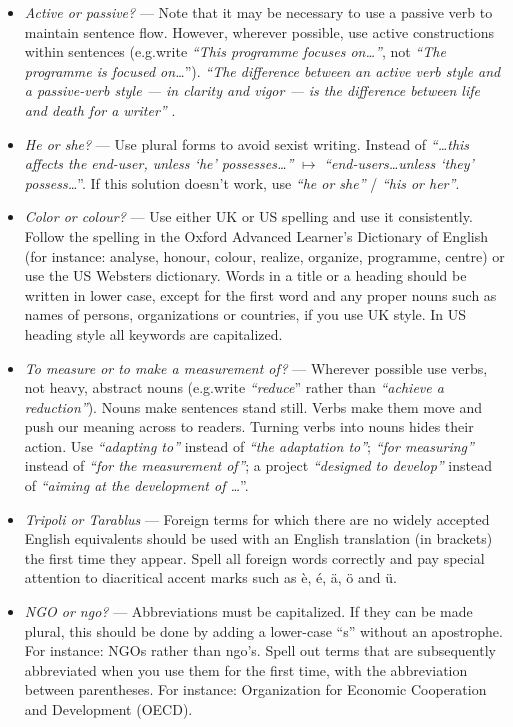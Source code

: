 \documentclass[graybox,envcountchap,sectrefs,UStrade]{svmono}
\begin{document}
 \begin{itemize}
  \item \emph{Active or passive?} --- Note that it may be necessary to use a passive verb to maintain sentence flow. However, wherever possible, use active constructions within sentences (e.g.\@ write \emph{``This programme focuses on\ldots ''}, not \emph{``The programme is focused on\ldots }''). \emph{``The difference between an active verb style and a passive-verb style --- in clarity and vigor --- is the difference between life and death for a writer''} \citep{Zinsser2006}.
 \item \emph{He or she?} --- Use plural forms to avoid sexist writing. Instead of \emph{``\ldots this affects the end-user, unless `he' possesses\ldots''} $\mapsto$  \emph{``end-users\ldots unless `they' possess\ldots }''. If this solution doesn't work, use \emph{``he or she''} / \emph{``his or her''}.
 \item \emph{Color or colour?} --- Use either UK or US spelling and use it consistently. Follow the spelling in the Oxford Advanced Learner's Dictionary of English (for instance: analyse, honour, colour, realize, organize, programme, centre) or use the US Websters dictionary. Words in a title or a heading should be written in lower case, except for the first word and any proper nouns such as names of persons, organizations or countries, if you use UK style. In US heading style all keywords are capitalized.
 \item \emph{To measure or to make a measurement of?} --- Wherever possible use verbs, not heavy, abstract nouns (e.g.\@ write \emph{``reduce}'' rather than \emph{``achieve a reduction''}). Nouns make sentences stand still. Verbs make them move and push our meaning across to readers. Turning verbs into nouns hides their action. Use \emph{``adapting to''} instead of \emph{``the adaptation to''}; \emph{``for measuring''} instead of \emph{``for the measurement of''}; a project \emph{``designed to develop''} instead of \emph{``aiming at the development of \ldots }''.
 \item \emph{Tripoli or Tarablus} --- Foreign terms for which there are no widely accepted English equivalents should be used with an English translation (in brackets) the first time they  appear. Spell all foreign words correctly and pay special attention to diacritical accent marks such as \`{e}, \'{e}, \"{a}, \"{o} and \"{u}.
 \item \emph{NGO or ngo?} --- Abbreviations must be capitalized. If they can be made plural, this should be done by adding a lower-case ``s'' without an apostrophe. For instance: NGOs rather than ngo's. Spell out terms that are subsequently abbreviated when you use them for the first time, with the abbreviation between parentheses. For instance: Organization for Economic Cooperation and Development (OECD).

\end{itemize}
\end{document}
